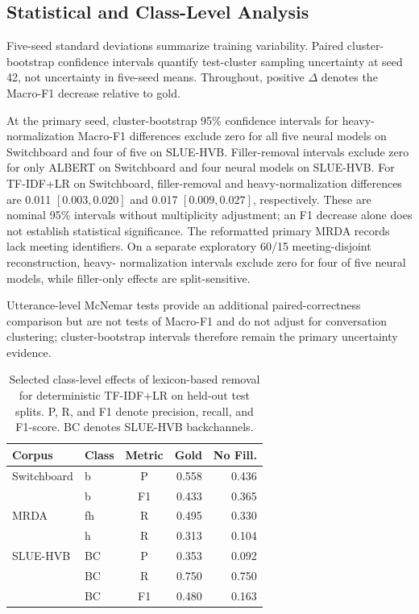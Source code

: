 \documentclass[conference]{IEEEtran}
\begin{document}
\subsection{Statistical and Class-Level Analysis}

Five-seed standard deviations summarize training
variability. Paired cluster-bootstrap confidence
intervals quantify test-cluster sampling uncertainty
at seed 42, not uncertainty in five-seed means.
Throughout, positive $\Delta$ denotes the
Macro-F1 decrease relative to gold.

At the primary seed, cluster-bootstrap 95\% confidence
intervals for heavy-normalization Macro-F1 differences
exclude zero for all five neural models on Switchboard
and four of five on SLUE-HVB. Filler-removal intervals
exclude zero for only ALBERT on Switchboard and four
neural models on SLUE-HVB. For TF-IDF+LR on Switchboard,
filler-removal and heavy-normalization differences are
0.011 $[0.003,0.020]$ and 0.017 $[0.009,0.027]$,
respectively. These are nominal 95\% intervals without
multiplicity adjustment; an F1 decrease alone does
not establish statistical significance. The reformatted
primary MRDA records lack meeting identifiers. On a
separate exploratory 60/15 meeting-disjoint reconstruction, heavy-
normalization intervals exclude zero for four of five
neural models, while filler-only effects are split-sensitive.

Utterance-level McNemar tests provide an additional
paired-correctness comparison but are not tests
of Macro-F1 and do not adjust for conversation
clustering; cluster-bootstrap intervals therefore
remain the primary uncertainty evidence.

\begin{table}[t]
\caption{Selected class-level effects of lexicon-based
removal for deterministic TF-IDF+LR on held-out test
splits. P, R, and F1 denote precision, recall, and
F1-score. BC denotes SLUE-HVB backchannels.}
\label{tab:class-effects}
\centering
\scriptsize
\setlength{\tabcolsep}{4pt}
\renewcommand{\arraystretch}{1.05}
\begin{tabular}{@{}llcrr@{}}
\toprule
\textbf{Corpus} & \textbf{Class} &
\textbf{Metric} & \textbf{Gold} & \textbf{No Fill.} \\
\midrule
Switchboard & b  & P  & 0.558 & 0.436 \\
            & b  & F1 & 0.433 & 0.365 \\
\midrule
MRDA        & fh & R  & 0.495 & 0.330 \\
            & h  & R  & 0.313 & 0.104 \\
\midrule
SLUE-HVB    & BC & P  & 0.353 & 0.092 \\
            & BC & R  & 0.750 & 0.750 \\
            & BC & F1 & 0.480 & 0.163 \\
\bottomrule
\end{tabular}
\end{table}
\end{document}

